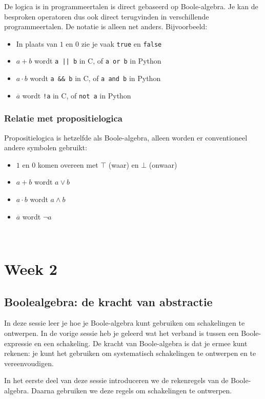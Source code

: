 \documentclass[11pt,a5paper]{report}
\begin{document}
De logica is in programmeertalen is direct gebaseerd op Boole-algebra. Je kan de besproken operatoren dus ook direct terugvinden in verschillende programmeertalen. De notatie is alleen net anders. Bijvoorbeeld:
\begin{itemize}
    \item In plaats van $1$ en $0$ zie je vaak \verb|true| en \verb|false|
    \item $a + b$ wordt \verb/a || b/ in C, of \verb|a or b| in Python
    \item $a \cdot b$ wordt \verb|a && b| in C, of \verb|a and b| in Python
    \item $\overline{a}$ wordt \verb|!a| in C, of \verb|not a| in Python
\end{itemize}

\subsection*{Relatie met propositielogica}

Propositielogica is hetzelfde als Boole-algebra, alleen worden er conventioneel andere symbolen gebruikt:
\begin{itemize}
    \item $1$ en $0$ komen overeen met $\top$ (waar) en $\bot$ (onwaar)
    \item $a + b$ wordt $a \lor b$
    \item $a \cdot b$ wordt $a \land b$
    \item $\overline{a}$ wordt $\neg a$
\end{itemize}



\newpage
\ 
\newpage
\chapter*{\centering Week 2}
\newpage

\section*{Boolealgebra: de kracht van abstractie}

In deze sessie leer je hoe je Boole-algebra kunt gebruiken om schakelingen te ontwerpen. In de vorige sessie heb je geleerd wat het verband is tussen een Boole-expressie en een schakeling. De kracht van Boole-algebra is dat je ermee kunt rekenen: je kunt het gebruiken om systematisch schakelingen te ontwerpen en te vereenvoudigen.

In het eerste deel van deze sessie introduceren we de rekenregels van de Boole-algebra. Daarna gebruiken we deze regels om schakelingen te ontwerpen.
\end{document}
